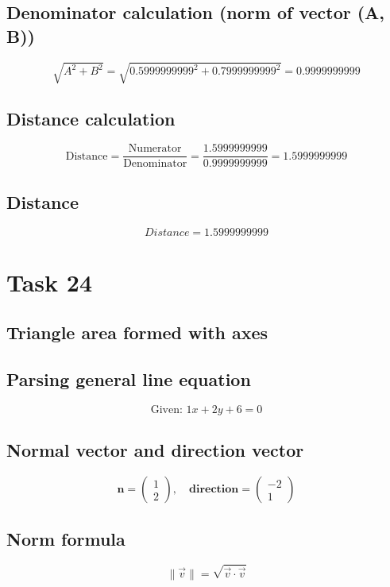 \documentclass{article}
\begin{document}
\subsection*{ \vspace{1em} Denominator calculation (norm of vector (A, B))}
\[
\sqrt{A^2 + B^2} = \sqrt{0.5999999999^2 + 0.7999999999^2} = 0.9999999999
\]
\subsection*{ \vspace{1em} Distance calculation}
\[
\text{Distance} = \frac{\text{Numerator}}{\text{Denominator}} = \frac{1.5999999999}{0.9999999999} = 1.5999999999
\]
\subsection*{ \vspace{1em} Distance}
\[
Distance = 1.5999999999
\]
\bigskip

\hrulefill
\bigskip

\section*{Task 24}

\subsection*{Triangle area formed with axes}
\subsection*{ \vspace{1em} Parsing general line equation}
\[
\text{Given: } 1x + 2y + 6 = 0
\]
\subsection*{ \vspace{1em} Normal vector and direction vector}
\[
\mathbf{n} = \begin{pmatrix}1 \\ 2\end{pmatrix}, \quad
           \mathbf{direction} = \begin{pmatrix}-2 \\ 1\end{pmatrix}
\]
\subsection*{ \vspace{1em} Norm formula}
\[
\|\vec{v}\| = \sqrt{\vec{v} \cdot \vec{v}}
\]
\end{document}
